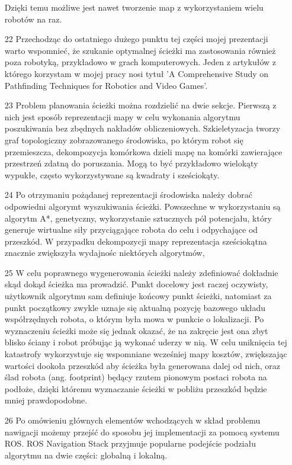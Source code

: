\documentclass[10pt,a4paper]{article}
\begin{document}
\begin{itemize}
Dzięki temu możliwe jest nawet tworzenie map z wykorzystaniem wielu robotów na raz.
		\item[22]
		Przechodząc do ostatniego dużego punktu tej części mojej prezentacji warto wspomnieć, że szukanie optymalnej ścieżki ma zastosowania również poza robotyką, przykładowo w grach komputerowych. 
Jeden z artykułów z którego korzystam w mojej pracy nosi tytuł  'A Comprehensive Study on Pathfinding Techniques for Robotics and Video Games'.
		\item[23]
		Problem planowania ścieżki można rozdzielić na dwie sekcje. 
Pierwszą z nich jest sposób reprezentacji mapy w celu wykonania algorytmu poszukiwania bez zbędnych nakładów obliczeniowych.
Szkieletyzacja tworzy graf topologiczny zobrazowanego środowiska, po którym robot się przemieszcza, dekompozycja komórkowa dzieli mapę na komórki zawierające przestrzeń zdatną do poruszania. Mogą to być przykładowo wielokąty wypukłe, często wykorzystywane są kwadraty i sześciokąty.
		\item[24]
		Po otrzymaniu pożądanej reprezentacji środowiska należy dobrać odpowiedni algorymt wyszukiwania ścieżki.
Powszechne w wykorzystaniu są algorytm A*, genetyczny, wykorzystanie sztucznych pól potencjału, który generuje wirtualne siły przyciągające robota do celu i odpychające od przeszkód.
W przypadku dekompozycji mapy reprezentacja sześciokątna znacznie zwiększyła wydajnośc niektórych algorytmów, 
		\item[25]
		 W celu poprawnego wygenerowania ścieżki należy zdefiniować dokładnie skąd dokąd ścieżka ma prowadzić.
Punkt docelowy jest raczej oczywisty, użytkownik algorytmu sam definiuje końcowy punkt ścieżki, natomiast za punkt początkowy zwykle uznaje się aktualną pozycję bazowego układu współrzędnych robota, o którym była mowa w punkcie o lokalizacji. 
Po wyznaczeniu ścieżki może się jednak okazać, że na zakręcie jest ona zbyt blisko ściany i robot próbując ją wykonać uderzy w nią.
W celu uniknięcia tej katastrofy wykorzystuje się wspomniane wcześniej mapy kosztów, zwiększając wartości dookoła przeszkód aby ścieżka była generowana dalej od nich, oraz ślad robota (ang. footprint) będący rzutem pionowym postaci robota na podłoże, dzięki któremu wyznaczanie ścieżki w pobliżu przeszkód będzie mniej prawdopodobne.
		\item[26]
		Po omówieniu głównych elementów wchodzących w skład problemu nawigacji możemy przejść do sposobu jej implementacji za pomocą systemu ROS.
ROS Navigation Stack przyjmuje popularne podejście podziału algorytmu na dwie części: globalną i lokalną.

\end{itemize}
\end{document}
